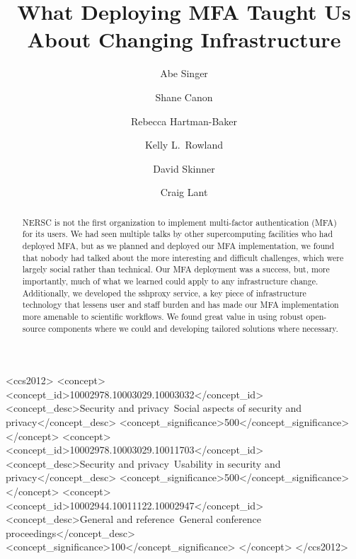 \documentclass[sigconf,review]{acmart}
\begin{document}
\title{What Deploying MFA Taught Us About Changing Infrastructure}

\author{Abe Singer}

\author{Shane Canon}

\author{Rebecca Hartman-Baker}

\author{Kelly L.\ Rowland}

\author{David Skinner}

\author{Craig Lant}

\begin{abstract}

NERSC is not the first organization to implement multi-factor authentication
(MFA) for its users. We had seen multiple talks by other supercomputing
facilities who had deployed MFA, but as we planned and deployed our MFA
implementation, we found that nobody had talked about the more interesting and
difficult challenges, which were largely social rather than technical. Our MFA
deployment was a success, but, more importantly, much of what we learned could
apply to any infrastructure change. Additionally, we developed the sshproxy
service, a key piece of infrastructure technology that lessens user and staff
burden and has made our MFA implementation more amenable to scientific
workflows. We found great value in using robust open-source components
where we could and developing tailored solutions where necessary.

\end{abstract}

\begin{CCSXML}
<ccs2012>
<concept>
<concept_id>10002978.10003029.10003032</concept_id>
<concept_desc>Security and privacy~Social aspects of security and privacy</concept_desc>
<concept_significance>500</concept_significance>
</concept>
<concept>
<concept_id>10002978.10003029.10011703</concept_id>
<concept_desc>Security and privacy~Usability in security and privacy</concept_desc>
<concept_significance>500</concept_significance>
</concept>
<concept>
<concept_id>10002944.10011122.10002947</concept_id>
<concept_desc>General and reference~General conference proceedings</concept_desc>
<concept_significance>100</concept_significance>
</concept>
</ccs2012>
\end{CCSXML}
\end{document}
